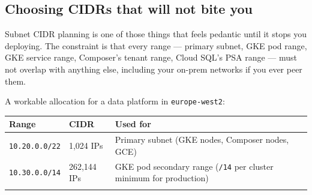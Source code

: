 \documentclass[
  11pt,
  british,
  oneside]{book}
\begin{document}
\hypertarget{choosing-cidrs-that-will-not-bite-you}{%
\subsection{Choosing CIDRs that will not bite
you}\label{choosing-cidrs-that-will-not-bite-you}}

Subnet CIDR planning is one of those things that
feels pedantic until it stops you deploying. The constraint is that
every range --- primary subnet, GKE pod range, GKE service range,
Composer's tenant range, Cloud SQL's PSA range --- must not overlap with
anything else, including your on-prem networks if you ever peer them.

A workable allocation for a data platform in \texttt{europe-west2}:

\begin{longtable}[]{@{}lll@{}}
\toprule
\begin{minipage}[b]{0.30\columnwidth}\raggedright
Range\strut
\end{minipage} & \begin{minipage}[b]{0.30\columnwidth}\raggedright
CIDR\strut
\end{minipage} & \begin{minipage}[b]{0.30\columnwidth}\raggedright
Used for\strut
\end{minipage}\tabularnewline
\midrule
\endhead
\begin{minipage}[t]{0.30\columnwidth}\raggedright
\texttt{10.20.0.0/22}\strut
\end{minipage} & \begin{minipage}[t]{0.30\columnwidth}\raggedright
1,024 IPs\strut
\end{minipage} & \begin{minipage}[t]{0.30\columnwidth}\raggedright
Primary subnet (GKE nodes, Composer nodes, GCE)\strut
\end{minipage}\tabularnewline
\begin{minipage}[t]{0.30\columnwidth}\raggedright
\texttt{10.30.0.0/14}\strut
\end{minipage} & \begin{minipage}[t]{0.30\columnwidth}\raggedright
262,144 IPs\strut
\end{minipage} & \begin{minipage}[t]{0.30\columnwidth}\raggedright
GKE pod secondary range (\texttt{/14} per cluster minimum for
production)\strut
\end{minipage}\tabularnewline
\begin{minipage}[t]{0.30\columnwidth}\raggedright

\end{minipage}
\end{longtable}
\end{document}
